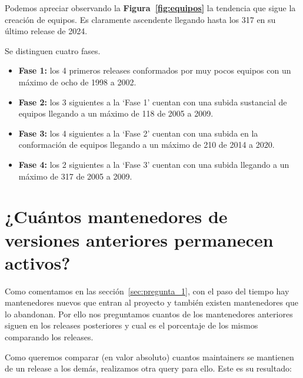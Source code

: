 \documentclass[a4paper, 12pt]{book}
\begin{document}
Podemos apreciar observando la \textbf{Figura~\ref{fig:equipos}} la tendencia que sigue la creación de equipos. Es claramente ascendente llegando hasta los 317 en su último release de 2024.

Se distinguen cuatro fases.
\begin{itemize}
	\item  \textbf{Fase 1:} los 4 primeros releases conformados por muy pocos equipos con un máximo de ocho de 1998 a 2002. 
	
	\item  \textbf{Fase 2:} los 3 siguientes a la `Fase 1' cuentan con una subida sustancial de equipos llegando a un máximo de 118 de 2005 a 2009.
	
	\item  \textbf{Fase 3:} los 4 siguientes a la `Fase 2' cuentan con una subida en la conformación de equipos llegando a un máximo de 210 de 2014 a 2020.
	
	\item  \textbf{Fase 4:} los 2 siguientes a la `Fase 3' cuentan con una subida  llegando a un máximo de 317 de 2005 a 2009.
	
\end{itemize}

\section{¿Cuántos mantenedores de versiones anteriores permanecen activos?}
\label{sec:pregunta_3}

Como comentamos en las sección~\ref{sec:pregunta_1}, con el paso del tiempo hay mantenedores nuevos que entran al proyecto y también existen mantenedores que lo abandonan. Por ello nos preguntamos cuantos de los mantenedores anteriores siguen en los releases posteriores y cual es el porcentaje de los mismos comparando los releases.



Como queremos comparar (en valor absoluto) cuantos maintainers se mantienen de un release a los demás, realizamos otra query para ello.
Este es su resultado:
	

	
		
\end{document}
